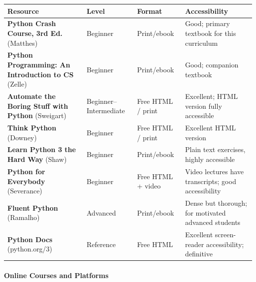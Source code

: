 \documentclass[
  justified,
  openright,
]{tufte-book}
\let\subsubsection\paragraph
\let\paragraph\paragraph
\let\subsubsection\paragraph
\let\paragraph\paragraph
\begin{document}
{\def\LTcaptype{none} %
\begin{longtable}[]{@{}
  >{\raggedright\arraybackslash}p{}
  >{\raggedright\arraybackslash}p{}
  >{\raggedright\arraybackslash}p{}
  >{\raggedright\arraybackslash}p{}@{}}
\toprule\noalign{}
\begin{minipage}[b]{\linewidth}\raggedright
Resource
\end{minipage} & \begin{minipage}[b]{\linewidth}\raggedright
Level
\end{minipage} & \begin{minipage}[b]{\linewidth}\raggedright
Format
\end{minipage} & \begin{minipage}[b]{\linewidth}\raggedright
Accessibility
\end{minipage} \\
\midrule\noalign{}
\endhead
\bottomrule\noalign{}
\endlastfoot
\textbf{Python Crash Course, 3rd Ed.} (Matthes) & Beginner & Print/ebook
& Good; primary textbook for this curriculum \\
\textbf{Python Programming: An Introduction to CS} (Zelle) & Beginner &
Print/ebook & Good; companion textbook \\
\textbf{Automate the Boring Stuff with Python} (Sweigart) &
Beginner--Intermediate & Free HTML / print & Excellent; HTML version
fully accessible \\
\textbf{Think Python} (Downey) & Beginner & Free HTML / print &
Excellent HTML version \\
\textbf{Learn Python 3 the Hard Way} (Shaw) & Beginner & Print/ebook &
Plain text exercises, highly accessible \\
\textbf{Python for Everybody} (Severance) & Beginner & Free HTML + video
& Video lectures have transcripts; good accessibility \\
\textbf{Fluent Python} (Ramalho) & Advanced & Print/ebook & Dense but
thorough; for motivated advanced students \\
\textbf{Python Docs} (python.org/3) & Reference & Free HTML & Excellent
screen-reader accessibility; definitive \\
\end{longtable}
}

\subsubsection{Online Courses and
Platforms}\label{online-courses-and-platforms}
\end{document}
